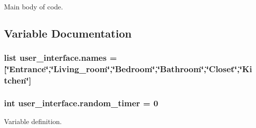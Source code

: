Main body of code. 



\subsection{Variable Documentation}
\subsubsection[{\texorpdfstring{names}{names}}]{\setlength{\rightskip}{0pt plus 5cm}list user\+\_\+interface.\+names = \mbox{[}\char`\"{}Entrance\char`\"{},\char`\"{}Living\+\_\+room\char`\"{},\char`\"{}Bedroom\char`\"{},\char`\"{}Bathroom\char`\"{},\char`\"{}Closet\char`\"{},\char`\"{}Kitchen\char`\"{}\mbox{]}}\hypertarget{namespaceuser__interface_a85e1f66e836d4199dd7325354493dff7}{}\label{namespaceuser__interface_a85e1f66e836d4199dd7325354493dff7}
\subsubsection[{\texorpdfstring{random\+\_\+timer}{random_timer}}]{\setlength{\rightskip}{0pt plus 5cm}int user\+\_\+interface.\+random\+\_\+timer = 0}\hypertarget{namespaceuser__interface_a97dbaeb7fcda50910c33a1460636019f}{}\label{namespaceuser__interface_a97dbaeb7fcda50910c33a1460636019f}


Variable definition. 


